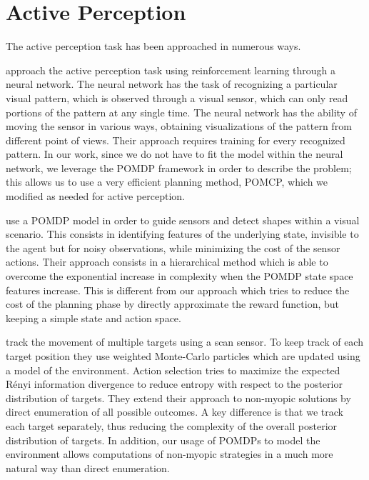 \section{Active Perception}

The active perception task has been approached in numerous ways.

\citet{cit:relworkneuralnet} approach the active perception task using reinforcement learning through
a neural network. The neural network has the task of recognizing a particular visual pattern, which
is observed through a visual sensor, which can only read portions of the pattern at any single time.
The neural network has the ability of moving the sensor in various ways, obtaining visualizations of
the pattern from different point of views. Their approach requires training for every recognized
pattern. In our work, since we do not have to fit the model within the neural network, we leverage
the POMDP framework in order to describe the problem; this allows us to use a very efficient
planning method, POMCP, which we modified as needed for active perception.

\citet{cit:relworkplanningsee} use a POMDP model in order to guide sensors and detect shapes within
a visual scenario. This consists in identifying features of the underlying state, invisible to the agent but
for noisy observations, while minimizing the cost of the sensor actions. Their approach consists in a
hierarchical method which is able to overcome the exponential increase in complexity when the POMDP 
state space features increase. This is different from our approach which tries to reduce the cost of the
planning phase by directly approximate the reward function, but keeping a simple state and action space.

\citet{cit:relworktanks} track the movement of multiple targets using a scan sensor. To keep track
of each target position they use weighted Monte-Carlo particles which are updated using a model of
the environment. Action selection tries to maximize the expected Rényi information divergence to
reduce entropy with respect to the posterior distribution of targets. They extend their approach to
non-myopic solutions by direct enumeration of all possible outcomes. A key difference is that we
track each target separately, thus reducing the complexity of the overall posterior distribution of
targets. In addition, our usage of POMDPs to model the environment allows computations of non-myopic
strategies in a much more natural way than direct enumeration.

